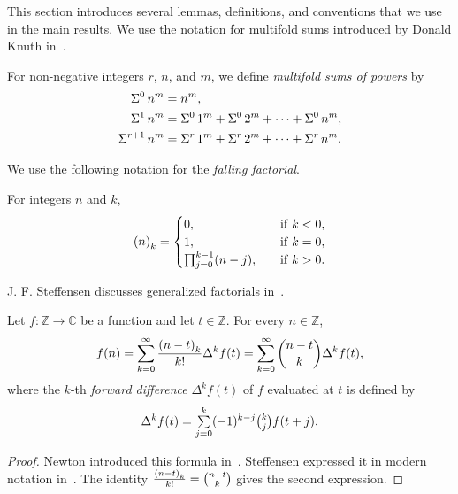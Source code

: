 This section introduces several lemmas, definitions, and conventions that we use in the main results.
We use the notation for multifold sums introduced by Donald Knuth in~\cite{knuth1993johann}.
\begin{definition}
  \label{def:multifold-sums-of-powers-recurrence}
  For non-negative integers $r$, $n$, and $m$, we define \emph{multifold sums of powers} by
  \begin{align*}
    \Sigma^{0}\,{n}^{m}   &= n^m, \\
    \Sigma^{1}\,{n}^{m}   &= \Sigma^{0}\,{1}^{m}
    + \Sigma^{0}\,{2}^{m} + \cdots + \Sigma^{0}\,{n}^{m}, \\
    \Sigma^{r+1}\,{n}^{m} &= \Sigma^{r}\,{1}^{m}
    + \Sigma^{r}\,{2}^{m} + \cdots + \Sigma^{r}\,{n}^{m}.
  \end{align*}
\end{definition}

We use the following notation for the \emph{falling factorial}.
\begin{definition}
  \label{def:falling-factorials}
  For integers $n$ and $k$,
  \begin{align*}
    \left(n\right)_{k} =
    \begin{cases}
      0, \quad & \mathrm{if \; } k < 0, \\
      1, \quad & \mathrm{if \; } k = 0, \\
      \prod_{j=0}^{k-1} (n-j), \quad & \mathrm{if \; } k>0.
    \end{cases}
  \end{align*}
\end{definition}
J. F. Steffensen discusses generalized factorials in~\cite{steffensen1933definition}.

\begin{lemma}
  \label{lem:forward-newtons-formula}
  Let $f\colon \mathbb{Z} \to \mathbb{C}$ be a function and let $t \in \mathbb{Z}$. For every $n \in \mathbb{Z}$,
  \begin{align*}
    f(n)
    = \sum_{k=0}^{\infty} \frac{\left(n-t\right)_{k}}{k!} \Delta^{k} f(t)
    = \sum_{k=0}^{\infty} \binom{n-t}{k} \Delta^{k} f(t),
  \end{align*}
  where the $k$-th \emph{forward difference} $\Delta^{k} f(t)$ of $f$
  evaluated at $t$ is defined by
  \begin{align*}
    \Delta^{k} f(t)
    = \mathop{\textstyle\sum}_{j=0}^{k} (-1)^{k-j} \tbinom{k}{j} f(t+j).
  \end{align*}
  \begin{proof}
    Newton introduced this formula in~\cite{newton1850newton}. Steffensen expressed it in modern notation in~\cite[Section 2, Equation (19)]{steffensen1927interpolation}. The identity
    $\frac{\left(n-t\right)_{k}}{k!} = \tbinom{n-t}{k}$
    gives the second expression.
  \end{proof}
\end{lemma}

